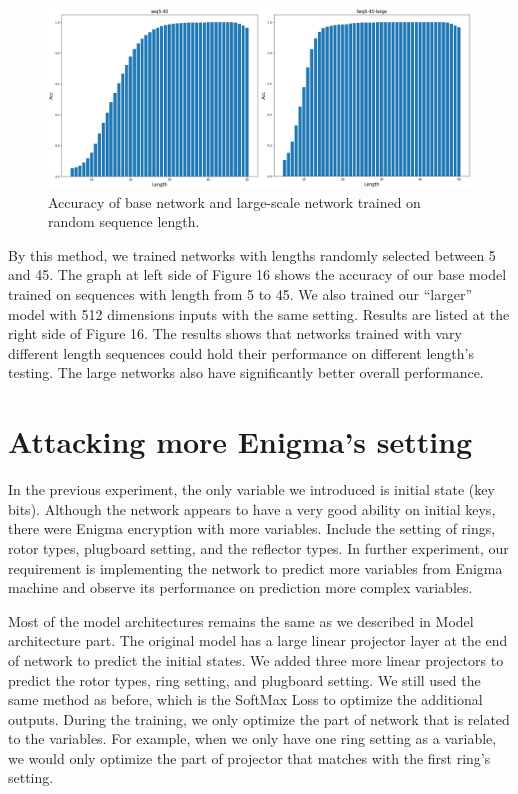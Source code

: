 \begin{figure}[hbt!]
    \centering
    \includegraphics[width=0.75\linewidth]{myReport//figures/different_scale_multi_length.png}
    \caption{Accuracy of base network and large-scale network trained on random sequence length.}
    \label{fig:enter-label}
\end{figure}


By this method, we trained networks with lengths randomly selected between 5 and 45. The graph at left side of Figure 16 shows the accuracy of our base model trained on sequences with length from 5 to 45. We also trained our “larger” model with 512 dimensions inputs with the same setting. Results are listed at the right side of Figure 16. The results shows that networks trained with vary different length sequences could hold their performance on different length’s testing. The large networks also have significantly better overall performance.


\section{Attacking more Enigma's setting}

In the previous experiment, the only variable we introduced is initial state (key bits). Although the network appears to have a very good ability on initial keys, there were Enigma encryption with more variables. Include the setting of rings, rotor types, plugboard setting, and the reflector types. In further experiment, our requirement is implementing the network to predict more variables from Enigma machine and observe its performance on prediction more complex variables. 

Most of the model architectures remains the same as we described in Model architecture part. The original model has a large linear projector layer at the end of network to predict the initial states. We added three more linear projectors to predict the rotor types, ring setting, and plugboard setting. We still used the same method as before, which is the SoftMax Loss to optimize the additional outputs. During the training, we only optimize the part of network that is related to the variables. For example, when we only have one ring setting as a variable, we would only optimize the part of projector that matches with the first ring's setting.

